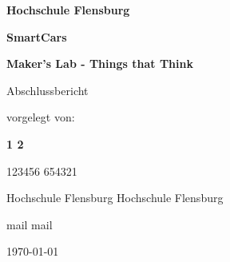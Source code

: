 \documentclass[a4paper, 11pt]{article}
\begin{document}
\begin{titlepage}
    \begin{center}
        {\LARGE\bfseries Hochschule Flensburg \par}
        \vspace{0.5cm}
        {\huge\bfseries SmartCars\par}
        \vspace{0.5cm}
        {\LARGE\bfseries Maker's Lab - Things that Think \par}
        \vspace{0.25cm}
        {\LARGE Abschlussbericht\par}
        \vspace{2cm}
        {\Large vorgelegt von: \par}
        \vspace{1cm}
        {\bfseries 1 \hfill \bfseries 2\par}
        { 123456 \hfill  654321\par}
        { Hochschule Flensburg \hfill Hochschule Flensburg \par}
        { mail \hfill  mail\par}
        \vfill
        \vfill
    
        {\large \today\par}
    \end{center}
\end{titlepage}
    \clearpage
    \thispagestyle{empty}

    \tableofcontents
    \pagebreak
\end{document}
